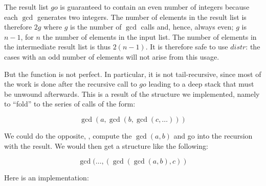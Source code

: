 \documentclass{scrreprt}
\newcommand{\Varid}[1]{\mathit{#1}}
\begin{document}
The result list \ensuremath{\Varid{go}} is guaranteed to contain an even
number of integers because each $\gcd$ generates
two integers. The number of elements in the result
list is therefore $2g$ where $g$ is the number
of $\gcd$ calls and, hence, always even;
$g$ is $n-1$, for $n$
the number of elements in the input list.
The number of elements in the intermediate
result list is thus $2(n-1)$.
It is therefore safe to use \ensuremath{\Varid{distr}}:
the cases with an odd number of elements
will not arise from this usage.

But the function is not perfect.
In particular, it is not tail-recursive,
since most of the work is done after
the recursive call to \ensuremath{\Varid{go}} leading
to a deep stack that must be unwound afterwards.
This is a result of the structure
we implemented, namely to ``fold''
to the series of calls of the form:

\[
\gcd(a, \gcd(b, \gcd(c, \dots)))
\]

We could do the opposite, \ie,
compute the $\gcd(a,b)$ and go
into the recursion with the result.
We would then get a structure like the following:

\[
\gcd(\dots, (\gcd(\gcd(a, b), c))
\]

Here is an implementation:
\end{document}
